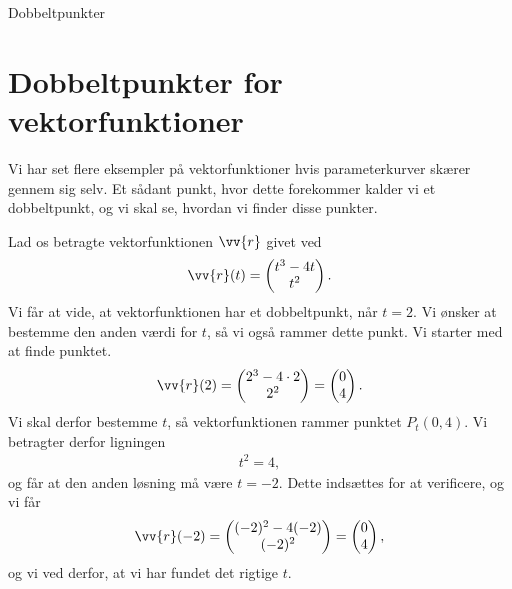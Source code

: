 
\begin{center}
	\Huge
	Dobbeltpunkter
\end{center}

\section*{Dobbeltpunkter for vektorfunktioner}

Vi har set flere eksempler på vektorfunktioner hvis parameterkurver skærer gennem sig selv. Et sådant punkt, hvor dette forekommer kalder vi et dobbeltpunkt, og vi skal se, hvordan vi finder disse punkter. 

\begin{exa}
	Lad os betragte vektorfunktionen $\vv{r}$ givet ved
	\begin{align*}
		\vv{r}(t) = 
		\begin{pmatrix}
			t^3-4t \\
			t^2
		\end{pmatrix}.
	\end{align*}
	Vi får at vide, at vektorfunktionen har et dobbeltpunkt, når $t=2$. Vi ønsker at bestemme den anden værdi for $t$, så vi også rammer dette punkt. 
	Vi starter med at finde punktet.
	\begin{align*}
		\vv{r}(2) = 
		\begin{pmatrix}
			2^3-4\cdot 2 \\
			2^2
		\end{pmatrix} =
		\begin{pmatrix}
			0 \\
			4
		\end{pmatrix}.
	\end{align*}
	Vi skal derfor bestemme $t$, så vektorfunktionen rammer punktet $P_t(0,4)$. Vi betragter derfor ligningen
	\begin{align*}
		t^2 = 4, 
	\end{align*}
	og får at den anden løsning må være $t=-2$. Dette indsættes for at verificere, og vi får
	\begin{align*}
		\vv{r}(-2) = 
		\begin{pmatrix}
			(-2)^2 - 4(-2) \\
			(-2)^2
		\end{pmatrix} = 
		\begin{pmatrix}
		 	0 \\
		 	4
		\end{pmatrix},
	\end{align*}
	og vi ved derfor, at vi har fundet det rigtige $t$. 
\end{exa}
